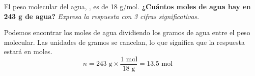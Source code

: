 El peso molecular del agua, , es de 18 g/mol.
\textbf{¿Cuántos moles de agua hay en 243 g de agua?}
\emph{Expresa la respuesta con 3 cifras significativas.}

\begin{solutionbox}{3cm}
    Podemos encontrar los moles de agua dividiendo los gramos de agua entre el peso molecular. Las unidades de gramos se cancelan, lo que significa que la respuesta estará en moles.
    \[ n =  243 \text{ g} \times \frac{1 \text{ mol}}{18 \text{ g}} = 13.5 \text{ mol} \]
\end{solutionbox}